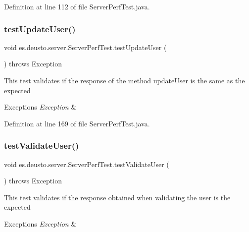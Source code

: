 Definition at line 112 of file Server\+Perf\+Test.\+java.

\mbox{\label{classes_1_1deusto_1_1server_1_1_server_perf_test_aeb4e8f76604acdd98213dec2e1f390d6}} 
\subsubsection{\texorpdfstring{test\+Update\+User()}{testUpdateUser()}}
{\footnotesize\ttfamily void es.\+deusto.\+server.\+Server\+Perf\+Test.\+test\+Update\+User (\begin{DoxyParamCaption}{ }\end{DoxyParamCaption}) throws Exception}

This test validates if the response of the method update\+User is the same as the expected 
\begin{DoxyExceptions}{Exceptions}
{\em Exception} & \\
\hline
\end{DoxyExceptions}


Definition at line 169 of file Server\+Perf\+Test.\+java.

\mbox{\label{classes_1_1deusto_1_1server_1_1_server_perf_test_a9006eeebc72b0f5aa9ee129d11a28b42}} 
\subsubsection{\texorpdfstring{test\+Validate\+User()}{testValidateUser()}}
{\footnotesize\ttfamily void es.\+deusto.\+server.\+Server\+Perf\+Test.\+test\+Validate\+User (\begin{DoxyParamCaption}{ }\end{DoxyParamCaption}) throws Exception}

This test validates if the response obtained when validating the user is the expected 
\begin{DoxyExceptions}{Exceptions}
{\em Exception} & \\
\hline
\end{DoxyExceptions}


